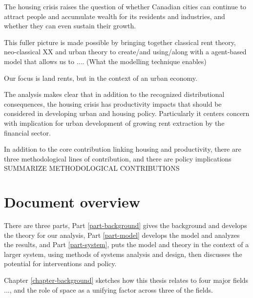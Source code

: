 The housing crisis raises the question of whether Canadian cities can continue to attract people and accumulate wealth for its residents and industries, and whether they can even sustain their growth.

This fuller picture is made possible by bringing together classical rent theory, neo-classical XX and urban theory to create/and using/along with a agent-based model that allows us to .... (What the modelling technique enables) 

Our focus is land rents, but in the context of an urban economy. 


The analysis makes clear that in addition to the recognized distributional consequences, the housing crisis has productivity impacts that should be considered in developing urban and housing policy. Particularly it centers concern with implication for urban development of growing rent extraction by the financial sector. 

In addition to the core contribution linking housing and productivity, %
there are three methodological lines of contribution, and there are policy implications SUMMARIZE METHODOLOGICAL CONTRIBUTIONS

\section{Document overview}
There are three parts, Part \ref{part-background} gives the background and develops the %
theory for our analysis, Part \ref{part-model} develops the model and analyzes the results, and Part \ref{part-system}, puts the model and theory in the context of a larger system, using methods of systems analysis and design, then discusses the potential for interventions and policy.

Chapter \ref{chapter-background} sketches how this thesis relates to four major fields ..., and the role of space as a unifying factor across three of the fields.

